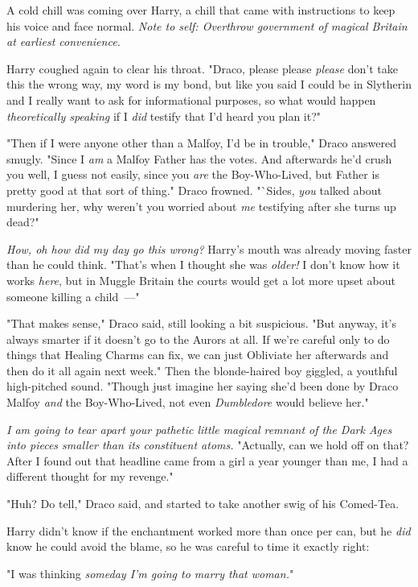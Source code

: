 A cold chill was coming over Harry, a chill that came with instructions to keep
his voice and face normal. \emph{Note to self: Overthrow government of magical
Britain at earliest convenience.}

Harry coughed again to clear his throat. "Draco, please please \emph{please}
don't take this the wrong way, my word is my bond, but like you said I could be
in Slytherin and I really want to ask for informational purposes, so what would
happen \emph{theoretically speaking} if I \emph{did} testify that I'd heard you
plan it?"

"Then if I were anyone other than a Malfoy, I'd be in trouble," Draco answered
smugly. "Since I \emph{am} a Malfoy{\el} Father has the votes. And
afterwards he'd crush you{\el} well, I guess not easily, since you
\emph{are} the Boy-Who-Lived, but Father is pretty good at that sort of thing."
Draco frowned. "`Sides, \emph{you} talked about murdering her, why weren't you
worried about \emph{me} testifying after she turns up dead?"

\emph{How, oh how did my day go this wrong?} Harry's mouth was already moving
faster than he could think. "That's when I thought she was \emph{older!} I
don't know how it works \emph{here}, but in Muggle Britain the courts would get
a lot more upset about someone killing a child~---"

"That makes sense," Draco said, still looking a bit suspicious. "But anyway,
it's always smarter if it doesn't go to the Aurors at all. If we're careful
only to do things that Healing Charms can fix, we can just Obliviate her
afterwards and then do it all again next week." Then the blonde-haired boy
giggled, a youthful high-pitched sound. "Though just imagine her saying she'd
been done by Draco Malfoy \emph{and} the Boy-Who-Lived, not even
\emph{Dumbledore} would believe her."

\emph{I am going to tear apart your pathetic little magical remnant of the Dark
Ages into pieces smaller than its constituent atoms.} "Actually, can we hold
off on that? After I found out that headline came from a girl a year younger
than me, I had a different thought for my revenge."

"Huh? Do tell," Draco said, and started to take another swig of his Comed-Tea.

Harry didn't know if the enchantment worked more than once per can, but he
\emph{did} know he could avoid the blame, so he was careful to time it exactly
right:

"I was thinking \emph{someday I'm going to marry that woman.}"

